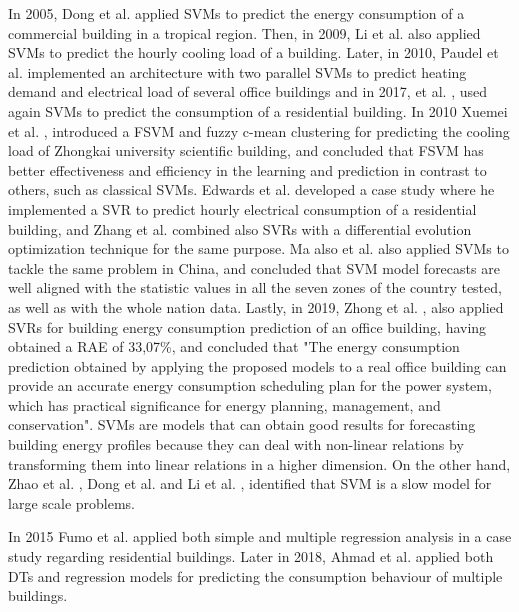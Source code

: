 In 2005, Dong et al. \cite{svm2} applied \ac{SVM}s to predict the energy consumption of a commercial building in a tropical region. Then, in 2009, Li et al. \cite{svmr1} also applied \ac{SVM}s to predict the hourly cooling load of a building. Later, in 2010, Paudel et al. \cite{svm3} implemented an architecture with two parallel \ac{SVM}s to predict heating demand and electrical load of several office buildings and in 2017, et al. \cite{svmr7}, used again \ac{SVM}s to predict the consumption of a residential building. In 2010 Xuemei et al. \cite{svmr2}, introduced a \ac{FSVM} and fuzzy c-mean clustering for predicting the cooling load of Zhongkai university scientific building, and concluded that \ac{FSVM} has better effectiveness and efficiency in the learning and prediction in contrast to others, such as classical \ac{SVM}s. Edwards et al. \cite{svmr3} developed a case study where he implemented a \ac{SVR} to predict hourly electrical consumption of a residential building, and Zhang et al. \cite{svmr4} combined also \ac{SVR}s with a differential evolution optimization technique for the same purpose. Ma also et al. \cite{svmr5} also applied \ac{SVM}s to tackle the same problem in China, and concluded that \ac{SVM} model forecasts are well aligned with the statistic values in all the seven zones of the country tested, as well as with the whole nation data. Lastly, in 2019, Zhong et al. \cite{svmr6}, also applied \ac{SVR}s for building energy consumption prediction of an office building, having obtained a \ac{RAE} of 33,07\%, and concluded that "The energy consumption prediction obtained by applying the proposed models to a real office building can provide an accurate energy consumption scheduling plan for the power system, which has practical significance for energy planning, management, and conservation". \ac{SVM}s are models that can obtain good results for forecasting building energy profiles because they can deal with non-linear relations by transforming them into linear relations in a higher dimension. On the other hand, Zhao et al. \cite{svm3}, Dong et al. \cite{svm2} and Li et al. \cite{svm5}, identified that \ac{SVM} is a slow model for large scale problems.
 
In 2015 Fumo et al. \cite{regression0} applied both simple and multiple regression analysis in a case study regarding residential buildings. Later in 2018, Ahmad et al. \cite{dt0} applied both DTs and regression models for predicting the consumption behaviour of multiple buildings.

